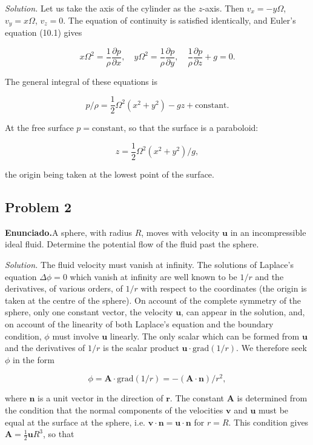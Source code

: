 \documentclass{article}
\begin{document}
\textit{Solution.} Let us take the axis of the cylinder as the $z$-axis. Then $v_x = -y\Omega$, $v_y = x\Omega$, $v_z = 0$. The equation of continuity is satisfied identically, and Euler's equation (10.1) gives

$$
x\Omega^2 = \frac{1}{\rho} \frac{\partial p}{\partial x}, \quad y\Omega^2 = \frac{1}{\rho} \frac{\partial p}{\partial y}, \quad \frac{1}{\rho} \frac{\partial p}{\partial z} + g = 0.
$$

The general integral of these equations is

$$
p/\rho = \frac{1}{2} \Omega^2 (x^2 + y^2) - gz + \text{constant}.
$$

At the free surface $p = \text{constant}$, so that the surface is a paraboloid:

$$
z = \frac{1}{2} \Omega^2 (x^2 + y^2)/g,
$$

the origin being taken at the lowest point of the surface.

\subsection*{Problem 2}

\textbf{Enunciado.}A sphere, with radius $R$, moves with velocity $\mathbf{u}$ in an incompressible ideal fluid. Determine the potential flow of the fluid past the sphere.

\textit{Solution.} The fluid velocity must vanish at infinity. The solutions of Laplace's equation $\Delta \phi = 0$ which vanish at infinity are well known to be $1/r$ and the derivatives, of various orders, of $1/r$ with respect to the coordinates (the origin is taken at the centre of the sphere). On account of the complete symmetry of the sphere, only one constant vector, the velocity $\mathbf{u}$, can appear in the solution, and, on account of the linearity of both Laplace's equation and the boundary condition, $\phi$ must involve $\mathbf{u}$ linearly. The only scalar which can be formed from $\mathbf{u}$ and the derivatives of $1/r$ is the scalar product $\mathbf{u} \cdot \text{grad} (1/r)$. We therefore seek $\phi$ in the form

$$
\phi = \mathbf{A} \cdot \text{grad} (1/r) = -(\mathbf{A} \cdot \mathbf{n})/r^2,
$$

where $\mathbf{n}$ is a unit vector in the direction of $\mathbf{r}$. The constant $\mathbf{A}$ is determined from the condition that the normal components of the velocities $\mathbf{v}$ and $\mathbf{u}$ must be equal at the surface at the sphere, i.e. $\mathbf{v} \cdot \mathbf{n} = \mathbf{u} \cdot \mathbf{n}$ for $r = R$. This condition gives $\mathbf{A} = \frac{1}{2} \mathbf{u} R^3$, so that
\end{document}
